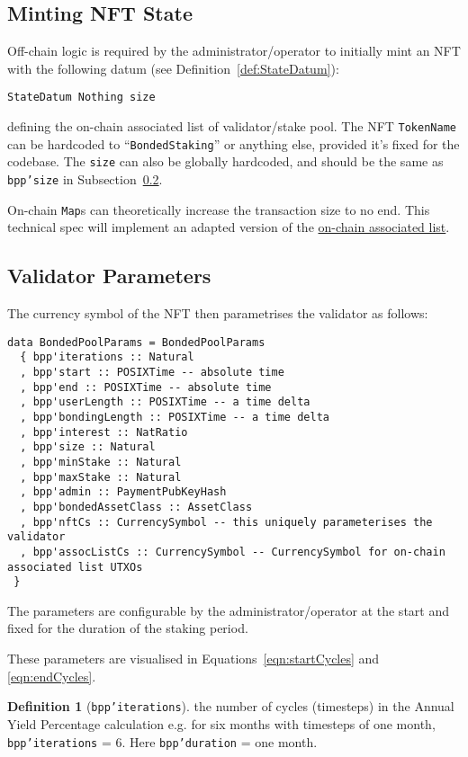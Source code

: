 \documentclass[10pt, a4paper]{article}
\theoremstyle{definition}
\newtheorem{definition}{Definition}[section]
\begin{document}
\subsection{Minting NFT State}\label{subsection:mintNft}
Off-chain logic is required by the administrator/operator to initially mint an NFT with the following datum (see Definition~\ref{def:StateDatum}):
\begin{verbatim}
StateDatum Nothing size
\end{verbatim}
defining the on-chain associated list of validator/stake pool. The NFT \texttt{TokenName} can be hardcoded to ``\texttt{BondedStaking}'' or anything else, provided it's fixed for the codebase. The \texttt{size} can also be globally hardcoded, and should be the same as \texttt{bpp'size} in Subsection~\ref{subsection:validatorParams}.

On-chain \texttt{Map}s can theoretically increase the transaction size to no end.  This technical spec will implement an adapted version of the  \href{https://github.com/Plutonomicon/plutonomicon/blob/main/assoc.md}{on-chain associated list}.


\subsection{Validator Parameters}\label{subsection:validatorParams}
The currency symbol of the NFT then parametrises the validator as follows:
\begin{verbatim}
data BondedPoolParams = BondedPoolParams
  { bpp'iterations :: Natural
  , bpp'start :: POSIXTime -- absolute time
  , bpp'end :: POSIXTime -- absolute time
  , bpp'userLength :: POSIXTime -- a time delta
  , bpp'bondingLength :: POSIXTime -- a time delta
  , bpp'interest :: NatRatio
  , bpp'size :: Natural
  , bpp'minStake :: Natural
  , bpp'maxStake :: Natural
  , bpp'admin :: PaymentPubKeyHash
  , bpp'bondedAssetClass :: AssetClass
  , bpp'nftCs :: CurrencySymbol -- this uniquely parameterises the validator
  , bpp'assocListCs :: CurrencySymbol -- CurrencySymbol for on-chain associated list UTXOs
 }
\end{verbatim}
The parameters are configurable by the administrator/operator at the start and fixed for the duration of the staking period.

These parameters are visualised in Equations~\ref{eqn:startCycles} and \ref{eqn:endCycles}.

\begin{definition}[\texttt{bpp'iterations}]\label{def:bpp'iterations}
the number of cycles (timesteps) in the Annual Yield Percentage calculation e.g. for six months with timesteps of one month, \texttt{bpp'iterations} = 6. Here \texttt{bpp'duration} = one month.
\end{definition}
\end{document}
